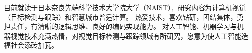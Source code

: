 

\begin{cvparagraph}

目前就读于日本奈良先端科学技术大学院大学（NAIST），研究内容为计算机视觉（目标检测与跟踪）和智慧城市普适计算。
热爱技术，喜欢钻研，团结集体，勇担责任，有清晰的逻辑思维、良好的编码实现能力。
对人工智能、机器学习与机器视觉技术充满热情，对视觉目标检测与跟踪领域有所研究，愿意为使人工智能造福社会添砖加瓦。
\end{cvparagraph}
